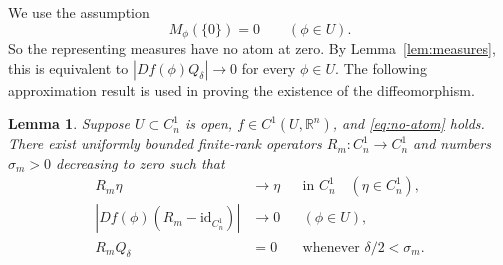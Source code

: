 \documentclass[11pt]{article}
\newtheorem{lemma}[theorem]{Lemma}
\newcommand{\id}{\mathrm{id}}
\begin{document}
We use the assumption
\begin{equation}\label{eq:no-atom}
 M_\phi(\{0\})=0\qquad(\phi\in U).
\end{equation}
So the representing measures have no atom at zero. By
Lemma~\ref{lem:measures}, this is equivalent to
$|Df(\phi)Q_\delta|\to0$ for every $\phi\in U$. The following
approximation result is used in proving the existence of the
diffeomorphism.

\begin{lemma}\label{lem:adapted}
Suppose $U\subset C_n^1$ is open, $f\in C^1(U,\mathbb R^n)$, and \eqref{eq:no-atom} holds. There exist uniformly bounded finite-rank operators $R_m:C_n^1\to C_n^1$ and numbers $\sigma_m>0$ decreasing to zero such that
\begin{align}
 R_m\eta&\longrightarrow\eta &&\text{in }C_n^1\quad(\eta\in C_n^1),\label{eq:adapted-strong}\\
 |Df(\phi)(R_m-\id_{C_n^1})|&\longrightarrow0 &&(\phi\in U),\label{eq:adapted-dual}\\
 R_mQ_\delta&=0 &&\text{whenever }\delta/2<\sigma_m.\label{eq:adapted-invisible}
\end{align}
\end{lemma}
\end{document}
